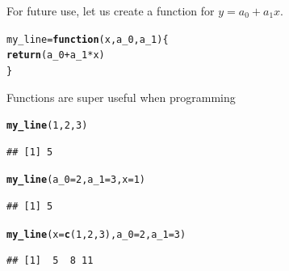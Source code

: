 \documentclass[aspectratio=169]{beamer}\usepackage[]{graphicx}\usepackage[]{xcolor}
\makeatletter
\newcommand{\hlnum}[1]{\textcolor[rgb]{0.686,0.059,0.569}{#1}}%
\newcommand{\hlopt}[1]{\textcolor[rgb]{0,0,0}{#1}}%
\newcommand{\hldef}[1]{\textcolor[rgb]{0.345,0.345,0.345}{#1}}%
\newcommand{\hlkwa}[1]{\textcolor[rgb]{0.161,0.373,0.58}{\textbf{#1}}}%
\newcommand{\hlkwb}[1]{\textcolor[rgb]{0.69,0.353,0.396}{#1}}%
\newcommand{\hlkwc}[1]{\textcolor[rgb]{0.333,0.667,0.333}{#1}}%
\newcommand{\hlkwd}[1]{\textcolor[rgb]{0.737,0.353,0.396}{\textbf{#1}}}%
\newenvironment{kframe}{%
 \def\at@end@of@kframe{}%
 \ifinner\ifhmode%
  \def\at@end@of@kframe{\end{minipage}}%
  \begin{minipage}{\columnwidth}%
 \fi\fi%
 \def\FrameCommand##1{\hskip\@totalleftmargin \hskip-\fboxsep
 \colorbox{shadecolor}{##1}\hskip-\fboxsep
     \hskip-\linewidth \hskip-\@totalleftmargin \hskip\columnwidth}%
 \MakeFramed {\advance\hsize-\width
   \@totalleftmargin\z@ \linewidth\hsize
   \@setminipage}}%
 {\par\unskip\endMakeFramed%
 \at@end@of@kframe}
\newenvironment{knitrout}{}{} %
\makeatother
\begin{document}
\begin{frame}[fragile]
For future use, let us create a function for $y = a_0 + a_1x$.

\begin{knitrout}
\color{fgcolor}\begin{kframe}
\begin{alltt}
\hldef{my_line} \hlkwb{=} \hlkwa{function}\hldef{(}\hlkwc{x}\hldef{,} \hlkwc{a_0}\hldef{,} \hlkwc{a_1}\hldef{)\{}
    \hlkwd{return}\hldef{(a_0} \hlopt{+} \hldef{a_1}\hlopt{*}\hldef{x)}
\hldef{\}}
\end{alltt}
\end{kframe}
\end{knitrout}

Functions are super useful when programming

\begin{knitrout}
\color{fgcolor}\begin{kframe}
\begin{alltt}
\hlkwd{my_line}\hldef{(}\hlnum{1}\hldef{,}\hlnum{2}\hldef{,}\hlnum{3}\hldef{)}
\end{alltt}
\begin{verbatim}
## [1] 5
\end{verbatim}
\begin{alltt}
\hlkwd{my_line}\hldef{(}\hlkwc{a_0} \hldef{=} \hlnum{2}\hldef{,} \hlkwc{a_1} \hldef{=} \hlnum{3}\hldef{,} \hlkwc{x} \hldef{=} \hlnum{1}\hldef{)}
\end{alltt}
\begin{verbatim}
## [1] 5
\end{verbatim}
\begin{alltt}
\hlkwd{my_line}\hldef{(}\hlkwc{x} \hldef{=} \hlkwd{c}\hldef{(}\hlnum{1}\hldef{,}\hlnum{2}\hldef{,}\hlnum{3}\hldef{),} \hlkwc{a_0} \hldef{=} \hlnum{2}\hldef{,} \hlkwc{a_1} \hldef{=} \hlnum{3}\hldef{)}
\end{alltt}
\begin{verbatim}
## [1]  5  8 11
\end{verbatim}
\end{kframe}
\end{knitrout}
\end{frame}
\end{document}
